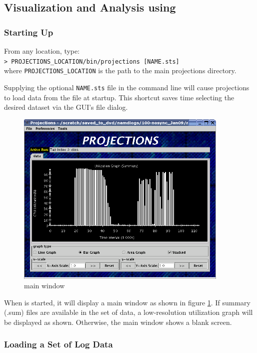 \documentclass[10pt]{article}
\begin{document}
\subsection{Visualization and Analysis using \projections{}}

\subsubsection{Starting Up}

From any location, type: \\
{\tt > PROJECTIONS\_LOCATION/bin/projections [NAME.sts]} \\
where {\tt PROJECTIONS\_LOCATION} is the path to the main projections
directory.

Supplying the optional {\tt NAME.sts} file in the command line will
cause projections to load data from the file at startup. This shortcut
saves time selecting the desired dataset via the GUI's file dialog.

\begin{figure}[hbt]
\center
\includegraphics[width=4.0in]{fig/front-with-summary}
\caption{\projections{} main window}
\label{mainwindow}
\end{figure}

When \projections{} is started, it will display a main window as shown
in figure \ref{mainwindow}. If summary (.sum) files are available in
the set of data, a low-resolution utilization graph will be displayed
as shown. Otherwise, the main window shows a blank screen.

\subsubsection{Loading a Set of Log Data}
\end{document}
